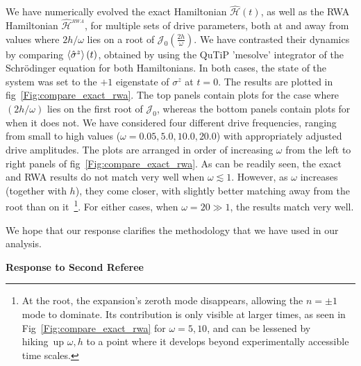 \documentclass[aps,prb,reprint,showpacs,floatfix,superscriptaddress, onecolumn, nofootinbib, 9pt]{revtex4-2}
\newcommand{\ar}[1]{{\color{blue}#1}} %
\begin{document}
\begin{enumerate}
{We have numerically evolved the exact Hamiltonian $\hat{\mathcal{H}}(t)$, as well as the RWA Hamiltonian $\hat{\mathcal{H}}^{_{RWA}}$, for multiple sets of drive parameters, both at and away from values where $2h/\omega$ lies on a root of $\mathcal{J}_0\left(\frac{2h}{\omega}\right)$. We have contrasted their dynamics by comparing $\expval{\hat{\sigma}^z}(t)$, obtained by using the QuTiP 'mesolve' integrator of the Schr\"odinger equation for both Hamiltonians. In both cases, the state of the system was set to the $+1$ eigenstate of $\sigma^z$ at $t=0$. The results are plotted in fig~\ref{Fig:compare_exact_rwa}. The top panels contain plots for the case where $(2h/\omega)$ lies on the first root of $\mathcal{J}_0$, whereas the bottom panels contain plots for when it does not. We have considered four different drive frequencies, ranging from small to high values ($\omega = 0.05, 5.0, 10.0, 20.0$) with appropriately adjusted drive amplitudes. The plots are arranged in order of increasing $\omega$ from the left to right panels of fig~\ref{Fig:compare_exact_rwa}. As can be readily seen, the exact and RWA results do not match very well when $\omega \lesssim 1$. However, as $\omega$ increases (together with $h$), they come closer, with slightly better matching away from the root than on it~\footnote{\ar{At the root, the expansion's zeroth mode disappears, allowing the $n=\pm 1$ mode to dominate. Its contribution is only visible at larger times, as seen in Fig~\ref{Fig:compare_exact_rwa} for $\omega=5, 10$, and can be lessened by hiking up $\omega, h$ to a point where it develops beyond experimentally accessible time scales.}}. For either cases, when $\omega=20 \gg 1$, the results match very well.

We hope that our response clarifies the methodology that we have used in our analysis.
}
\end{enumerate}

\noindent \textbf{Response to Second Referee}
\end{document}
